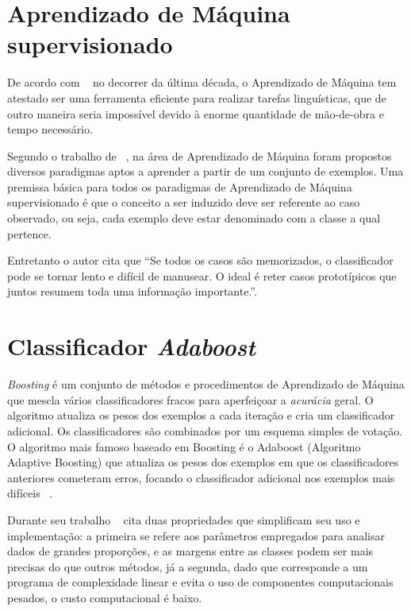 \section{Aprendizado de Máquina supervisionado}

De acordo com ~\cite{de2005anotaccao} no decorrer da última década, o Aprendizado de Máquina tem atestado ser uma ferramenta eficiente para realizar tarefas linguísticas, que de outro maneira seria impossível devido à enorme quantidade de mão-de-obra e tempo necessário. 

Segundo o trabalho de ~\cite{batista2003pre}, na área de Aprendizado de Máquina foram propostos diversos paradigmas aptos a aprender a partir de um conjunto de exemplos. Uma premissa básica para todos os paradigmas de Aprendizado de Máquina supervisionado é que o conceito a ser induzido deve ser referente ao caso observado, ou seja, cada exemplo deve estar denominado com a classe a qual pertence. 

Entretanto o autor cita que ``Se todos os casos são memorizados, o classificador pode se tornar lento e difícil de manusear. O ideal é reter casos prototípicos que juntos resumem toda uma informação importante.''.

\section{Classificador \textit{Adaboost}}

\textit{Boosting} é um conjunto de métodos e procedimentos de Aprendizado de Máquina que mescla vários classificadores fracos para aperfeiçoar a \textit{acurácia} geral. O algoritmo atualiza os pesos dos exemplos a cada iteração e cria um classificador adicional. Os classificadores são combinados por um esquema simples de votação. O algoritmo mais famoso baseado em Boosting é o Adaboost (Algoritmo Adaptive Boosting) que atualiza os pesos dos exemplos em que os classificadores anteriores cometeram erros, focando o classificador adicional nos exemplos mais difíceis ~\cite {duarte2009algoritmo}.

Durante seu trabalho ~\cite{merjildo2013algoritmo} cita duas propriedades que simplificam seu uso e implementação: a primeira se refere aos parâmetros empregados para analisar dados de grandes proporções,
e as margens entre as classes podem ser mais precisas do que outros métodos, já a segunda, dado que corresponde a um programa de complexidade linear e evita o uso de componentes computacionais pesados, o custo computacional é baixo.

